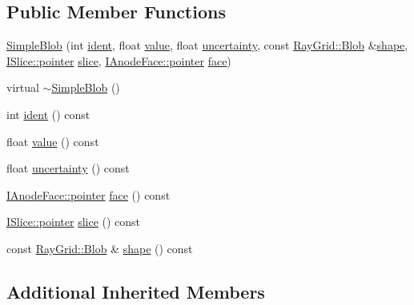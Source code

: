 \subsection*{Public Member Functions}
\begin{DoxyCompactItemize}
\item 
\hyperlink{class_wire_cell_1_1_simple_blob_a951bdf9fb09de509bd88a366fa657b69}{Simple\+Blob} (int \hyperlink{class_wire_cell_1_1_simple_blob_a0eb326289c6563bc64e2cca032022631}{ident}, float \hyperlink{class_wire_cell_1_1_simple_blob_ad4e01188fcc5814783beca0895c814b3}{value}, float \hyperlink{class_wire_cell_1_1_simple_blob_a011fc52f38b039df8212e517760d3340}{uncertainty}, const \hyperlink{class_wire_cell_1_1_ray_grid_1_1_blob}{Ray\+Grid\+::\+Blob} \&\hyperlink{class_wire_cell_1_1_simple_blob_ab681a5c8c24fe4eed58344a7443a1484}{shape}, \hyperlink{class_wire_cell_1_1_i_data_aff870b3ae8333cf9265941eef62498bc}{I\+Slice\+::pointer} \hyperlink{class_wire_cell_1_1_simple_blob_a0368534dca8425f5a5ef5498debd97c7}{slice}, \hyperlink{class_wire_cell_1_1_interface_a09c548fb8266cfa39afb2e74a4615c37}{I\+Anode\+Face\+::pointer} \hyperlink{class_wire_cell_1_1_simple_blob_a253020b71e348b9a016ec81a86754ffd}{face})
\item 
virtual \hyperlink{class_wire_cell_1_1_simple_blob_a81aaca8da596e55844a69db107e8596d}{$\sim$\+Simple\+Blob} ()
\item 
int \hyperlink{class_wire_cell_1_1_simple_blob_a0eb326289c6563bc64e2cca032022631}{ident} () const
\item 
float \hyperlink{class_wire_cell_1_1_simple_blob_ad4e01188fcc5814783beca0895c814b3}{value} () const
\item 
float \hyperlink{class_wire_cell_1_1_simple_blob_a011fc52f38b039df8212e517760d3340}{uncertainty} () const
\item 
\hyperlink{class_wire_cell_1_1_interface_a09c548fb8266cfa39afb2e74a4615c37}{I\+Anode\+Face\+::pointer} \hyperlink{class_wire_cell_1_1_simple_blob_a253020b71e348b9a016ec81a86754ffd}{face} () const
\item 
\hyperlink{class_wire_cell_1_1_i_data_aff870b3ae8333cf9265941eef62498bc}{I\+Slice\+::pointer} \hyperlink{class_wire_cell_1_1_simple_blob_a0368534dca8425f5a5ef5498debd97c7}{slice} () const
\item 
const \hyperlink{class_wire_cell_1_1_ray_grid_1_1_blob}{Ray\+Grid\+::\+Blob} \& \hyperlink{class_wire_cell_1_1_simple_blob_ab681a5c8c24fe4eed58344a7443a1484}{shape} () const
\end{DoxyCompactItemize}
\subsection*{Additional Inherited Members}


